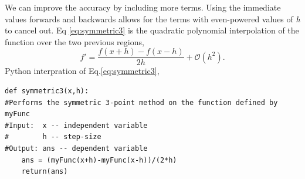 \documentclass[10pt]{article}
\begin{document}
We can improve the accuracy by including more terms. Using the immediate values forwards and backwards allows for the terms with even-powered values of \textit{h} to cancel out. Eq \ref{eq:symmetric3} is the quadratic polynomial interpolation of the function over the two previous regions,
\begin{equation}
\label{eq:symmetric3}
f'=\frac{f(x+h)-f(x-h)}{2h} + \mathcal{O}(h^2).
\end{equation} 
Python interpration of Eq.\ref{eq:symmetric3},
\begin{lstlisting}
def symmetric3(x,h):
#Performs the symmetric 3-point method on the function defined by myFunc
#Input:  x -- independent variable
#        h -- step-size
#Output: ans -- dependent variable
    ans = (myFunc(x+h)-myFunc(x-h))/(2*h)
    return(ans)
\end{lstlisting}
\end{document}

